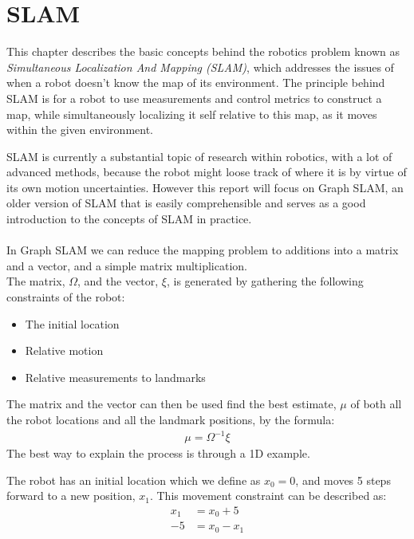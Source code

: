 \chapter{SLAM}
\label{chp:slam}

This chapter describes the basic concepts behind the robotics problem known as \emph{Simultaneous Localization And Mapping (SLAM)}, which addresses the issues of when a robot doesn't know the map of its environment.
The principle behind SLAM is for a robot to use measurements and control metrics to construct a map, while simultaneously localizing it self relative to this map, as it moves within the given environment.

SLAM is currently a substantial topic of research within robotics, with a lot of advanced methods, because the robot might loose track of where it is by virtue of its own motion uncertainties.
However this report will focus on Graph SLAM, an older version of SLAM that is easily comprehensible and serves as a good introduction to the concepts of SLAM in practice.\\\\

\noindent In Graph SLAM we can reduce the mapping problem to additions into a matrix and a vector, and a simple matrix multiplication.\\
The matrix, $\Omega$, and the vector, $\xi$, is generated by gathering the following constraints of the robot:
\begin{itemize}
    \item The initial location
    \item Relative motion
    \item Relative measurements to landmarks
\end{itemize}
The matrix and the vector can then be used find the best estimate, $\mu$ of both all the robot locations and all the landmark positions, by the formula:
\begin{align*}
    \mu = \Omega^{-1} \xi
\end{align*}
The best way to explain the process is through a 1D example.



The robot has an initial location which we define as $x_0 = 0$, and moves 5 steps forward to a new position, $x_1$.
This movement constraint can be described as:
\begin{align*}
x_1 &= x_0 + 5\\
-5  &= x_0 - x_1
\end{align*}

